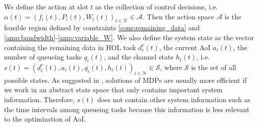 \documentclass[lettersize, journal]{IEEEtran}
\begin{document}
We define the action at slot $t$ as the collection of control decisions, i.e. 
$\alpha(t) = (f_i(t), P_i(t), W_i(t))_{i\in\mathcal{N}} \in \mathcal{A}$.
Then the action space $\mathcal{A}$ is the 
feasible region defined by constraints \eqref{cons:remaining_data} and \eqref{amp:bandwidth}-\eqref{amp:variable_W}. 
We also define the system state as the vector containing the remaining data in HOL task $d^r_i(t)$,
the current AoI $a_i(t)$, the number of queueing tasks $q_i(t)$,
and the channel state $h_i(t)$, i.e. $s(t) = (d^r_i(t), a_i(t), q_i(t), h_i(t))_{i\in\mathcal{N}} \in \mathcal{S}$,
where $\mathcal{S}$ is the set of all possible states.
As suggested in \cite{li2006towards}, solutions of MDPs are usually more efficient if we work in an abstract state space that
only contains important system information.
Therefore, $s(t)$ does not contain other system information such as the time intervals among queueing tasks
because this information is less relevant to the optimization of AoI.
\end{document}

